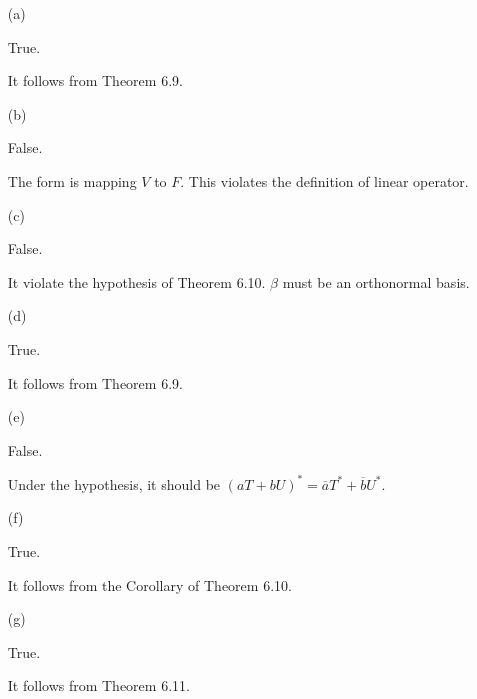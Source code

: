 \begin{Exercise}
	\begin{enumerate}[(a)]
		\item[(a)]
		\begin{answer}
			True.
		\end{answer}
		\begin{solution}
			It follows from Theorem 6.9.
		\end{solution}
		
		\item[(b)]
		\begin{answer}
			False.
		\end{answer}
		\begin{solution}
			The form is mapping $V$ to $F$. This violates the definition of linear operator.
		\end{solution}
		
		\item[(c)]
		\begin{answer}
			False.
		\end{answer}
		\begin{solution}
			It violate the hypothesis of Theorem 6.10. $\beta$ must be an orthonormal basis.
		\end{solution}
		
		\item[(d)]
		\begin{answer}
			True.
		\end{answer}
		\begin{solution}
			It follows from Theorem 6.9.
		\end{solution}
		
		\item[(e)]
		\begin{answer}
			False.
		\end{answer}
		\begin{solution}
			Under the hypothesis, it should be $(a T + b U)^* = \overline{a}T^* + \overline{b}U^*$.
		\end{solution}
		
		\item[(f)]
		\begin{answer}
			True.
		\end{answer}
		\begin{solution}
			It follows from the Corollary of Theorem 6.10.
		\end{solution}
		
		\item[(g)]
		\begin{answer}
			True.
		\end{answer}
		\begin{solution}
			It follows from Theorem 6.11.
		\end{solution}
		
	\end{enumerate}
\end{Exercise}
